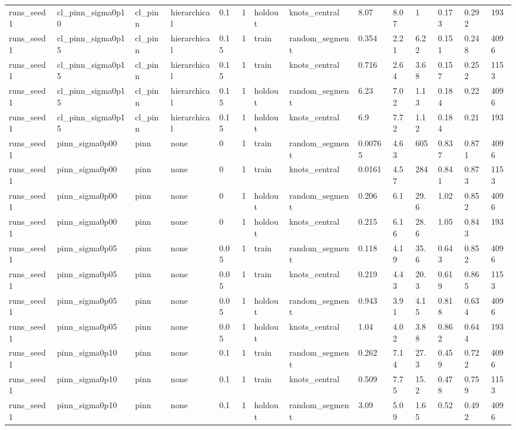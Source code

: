 \begin{table}[t]
\begin{tabular}{llllllllllllll}
runs\_seed1 & cl\_pinn\_sigma0p10 & cl\_pinn & hierarchical & 0.1 & 1 & holdout & knots\_central & 8.07 & 8.07 & 1 & 0.173 & 0.292 & 193 \\
runs\_seed1 & cl\_pinn\_sigma0p15 & cl\_pinn & hierarchical & 0.15 & 1 & train & random\_segment & 0.354 & 2.21 & 6.22 & 0.151 & 0.248 & 4096 \\
runs\_seed1 & cl\_pinn\_sigma0p15 & cl\_pinn & hierarchical & 0.15 & 1 & train & knots\_central & 0.716 & 2.64 & 3.68 & 0.157 & 0.252 & 1153 \\
runs\_seed1 & cl\_pinn\_sigma0p15 & cl\_pinn & hierarchical & 0.15 & 1 & holdout & random\_segment & 6.23 & 7.02 & 1.13 & 0.184 & 0.22 & 4096 \\
runs\_seed1 & cl\_pinn\_sigma0p15 & cl\_pinn & hierarchical & 0.15 & 1 & holdout & knots\_central & 6.9 & 7.72 & 1.12 & 0.184 & 0.21 & 193 \\
runs\_seed1 & pinn\_sigma0p00 & pinn & none & 0 & 1 & train & random\_segment & 0.00765 & 4.63 & 605 & 0.837 & 0.871 & 4096 \\
runs\_seed1 & pinn\_sigma0p00 & pinn & none & 0 & 1 & train & knots\_central & 0.0161 & 4.57 & 284 & 0.841 & 0.873 & 1153 \\
runs\_seed1 & pinn\_sigma0p00 & pinn & none & 0 & 1 & holdout & random\_segment & 0.206 & 6.1 & 29.6 & 1.02 & 0.852 & 4096 \\
runs\_seed1 & pinn\_sigma0p00 & pinn & none & 0 & 1 & holdout & knots\_central & 0.215 & 6.16 & 28.6 & 1.05 & 0.843 & 193 \\
runs\_seed1 & pinn\_sigma0p05 & pinn & none & 0.05 & 1 & train & random\_segment & 0.118 & 4.19 & 35.6 & 0.643 & 0.852 & 4096 \\
runs\_seed1 & pinn\_sigma0p05 & pinn & none & 0.05 & 1 & train & knots\_central & 0.219 & 4.43 & 20.3 & 0.619 & 0.865 & 1153 \\
runs\_seed1 & pinn\_sigma0p05 & pinn & none & 0.05 & 1 & holdout & random\_segment & 0.943 & 3.91 & 4.15 & 0.818 & 0.634 & 4096 \\
runs\_seed1 & pinn\_sigma0p05 & pinn & none & 0.05 & 1 & holdout & knots\_central & 1.04 & 4.02 & 3.88 & 0.862 & 0.644 & 193 \\
runs\_seed1 & pinn\_sigma0p10 & pinn & none & 0.1 & 1 & train & random\_segment & 0.262 & 7.14 & 27.3 & 0.459 & 0.722 & 4096 \\
runs\_seed1 & pinn\_sigma0p10 & pinn & none & 0.1 & 1 & train & knots\_central & 0.509 & 7.75 & 15.2 & 0.478 & 0.759 & 1153 \\
runs\_seed1 & pinn\_sigma0p10 & pinn & none & 0.1 & 1 & holdout & random\_segment & 3.09 & 5.09 & 1.65 & 0.52 & 0.492 & 4096 \\

\end{tabular}
\end{table}
